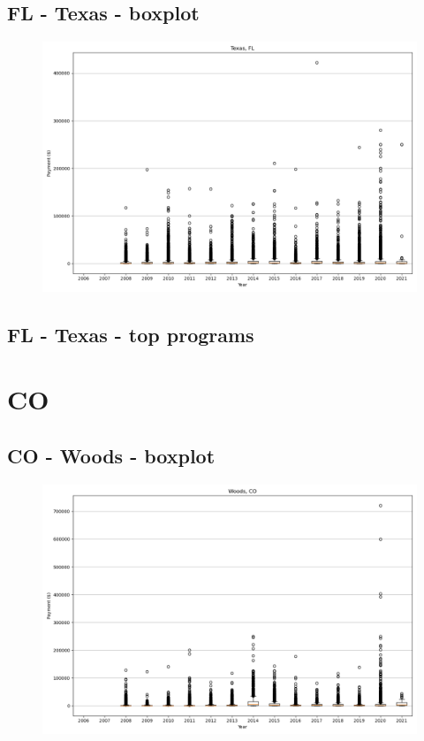 \subsection*{FL - Texas - boxplot}
\begin{figure}[h]
\centering
\includegraphics[width=7in]{../output/boxplots/counties/Texas-FL_boxplot.png}
\end{figure}


\subsection*{FL - Texas - top programs}

\newpage
\section*{CO}
\subsection*{CO - Woods - boxplot}
\begin{figure}[h]
\centering
\includegraphics[width=7in]{../output/boxplots/counties/Woods-CO_boxplot.png}
\end{figure}


